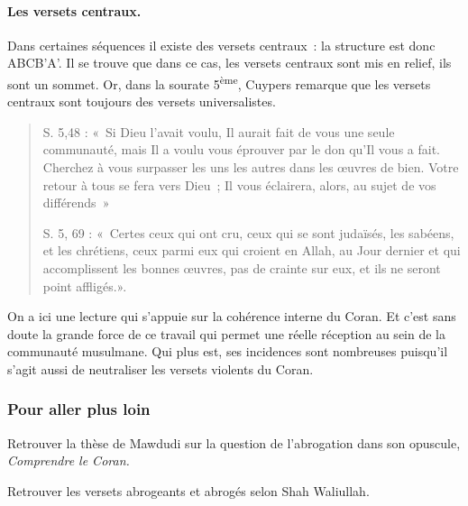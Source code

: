 \paragraph{\textbf{Les versets centraux.}}

Dans certaines séquences il existe des versets centraux~: la structure
est donc ABCB'A'. Il se trouve que dans ce cas, les versets centraux
sont mis en relief, ils sont un sommet. Or, dans la sourate
5\textsuperscript{ème}, Cuypers remarque que les versets centraux sont
toujours des versets universalistes.
\begin{quote}
    S. 5,48 : «~Si Dieu l'avait voulu, Il aurait fait de vous une seule
communauté, mais Il a voulu vous éprouver par le don qu'Il vous a fait.
Cherchez à vous surpasser les uns les autres dans les œuvres de bien.
Votre retour à tous se fera vers Dieu~; Il vous éclairera, alors, au
sujet de vos différends~»


S. 5, 69 : «~Certes ceux qui ont cru, ceux qui se sont judaïsés, les
sabéens, et les chrétiens, ceux parmi eux qui croient en Allah, au Jour
dernier et qui accomplissent les bonnes œuvres, pas de crainte sur eux,
et ils ne seront point affligés.».


\end{quote}

On a ici une lecture qui s'appuie sur la cohérence interne du Coran. Et
c'est sans doute la grande force de ce travail qui permet une réelle
réception au sein de la communauté musulmane. Qui plus est, ses
incidences sont nombreuses puisqu'il s'agit aussi de neutraliser les
versets violents du Coran.

\subsubsection{Pour aller plus loin}

Retrouver la thèse de Mawdudi sur la question de l'abrogation dans son
opuscule, \emph{Comprendre le Coran.}

Retrouver les versets abrogeants et abrogés selon Shah Waliullah.



